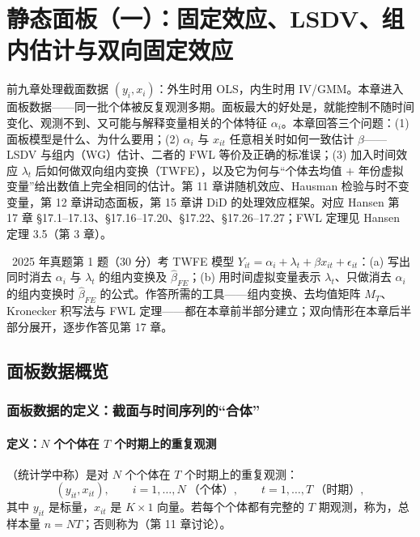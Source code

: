 \chapter{静态面板（一）：固定效应、LSDV、组内估计与双向固定效应}
\label{ch:U10a-panel1}

前九章处理截面数据 $(y_i,x_i)$：外生时用 OLS，内生时用 IV/GMM。本章进入面板数据——同一批个体被反复观测多期。面板最大的好处是，就能控制不随时间变化、观测不到、又可能与解释变量相关的个体特征 $\alpha_i$。本章回答三个问题：(1) 面板模型是什么、为什么要用；(2) $\alpha_i$ 与 $x_{it}$ 任意相关时如何一致估计 $\beta$——LSDV 与组内（WG）估计、二者的 FWL 等价及正确的标准误；(3) 加入时间效应 $\lambda_t$ 后如何做双向组内变换（TWFE），以及它为何与“个体去均值 $+$ 年份虚拟变量”给出数值上完全相同的估计。第 11 章讲随机效应、Hausman 检验与时不变变量，第 12 章讲动态面板，第 15 章讲 DiD 的处理效应框架。对应 Hansen 第 17 章 §17.1–17.13、§17.16–17.20、§17.22、§17.26–17.27；FWL 定理见 Hansen 定理 3.5（第 3 章）。

\begin{keypt}
\tagexam\ 2025 年真题第 1 题（30 分）考 TWFE 模型 $Y_{it}=\alpha_i+\lambda_t+\beta x_{it}+\epsilon_{it}$：(a) 写出同时消去 $\alpha_i$ 与 $\lambda_t$ 的组内变换及 $\hat\beta_{FE}$；(b) 用时间虚拟变量表示 $\lambda_t$、只做消去 $\alpha_i$ 的组内变换时 $\hat\beta_{FE}$ 的公式。作答所需的工具——组内变换、去均值矩阵 $M_T$、Kronecker 积写法与 FWL 定理——都在本章前半部分建立；双向情形在本章后半部分展开，逐步作答见第 17 章。
\end{keypt}

\section{面板数据概览}\label{sec:U10a-overview}

\subsection{面板数据的定义：截面与时间序列的“合体”}

\subsubsection{定义：\texorpdfstring{$N$}{N} 个个体在 \texorpdfstring{$T$}{T} 个时期上的重复观测}

\begin{defn}[面板数据]\label{def:U10a-panel}
（统计学中称）是对 $N$ 个个体在 $T$ 个时期上的重复观测：
\[
(y_{it},x_{it}),\qquad i=1,\dots,N\ \text{（个体）},\qquad t=1,\dots,T\ \text{（时期）},
\]
其中 $y_{it}$ 是标量，$x_{it}$ 是 $K\times 1$ 向量。若每个个体都有完整的 $T$ 期观测，称为，总样本量 $n=NT$；否则称为（第 11 章讨论）。
\end{defn}

